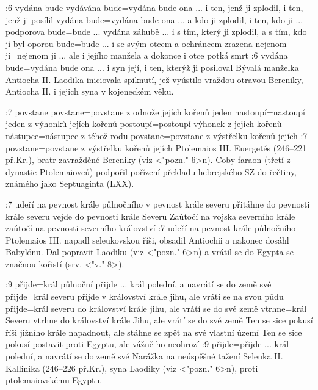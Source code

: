 :6
    {vydána bude}   %
    {vydávána bude}={vydána bude ona ... i ten, jenž ji zplodil, i ten, jenž ji posílil}   %
    {vydána bude}={vydána bude ona ... a kdo ji zplodil, i ten, kdo ji ... podporova}   %
    {bude}={bude ... vydána záhubě ... i s tím, který ji zplodil, a s tím, kdo jí byl oporou}   %
    {bude}={bude ... i se svým otcem a ochráncem zrazena}   %
    {nejenom ji}={nejenom ji ... ale i jejího manžela a dokonce i otce potká smrt}   %
:6 {vydána bude}={vydána bude ona ... i syn její, i ten, kterýž ji posiloval} 
    Bývalá manželka Antiocha II. Laodika iniciovala spiknutí, jež vyústilo vraždou otravou Bereniky, Antiocha II. i jejich syna v kojeneckém věku.


:7  
    {povstane}   %
    {povstane}={povstane z odnože jejích kořenů jeden}   %
    {nastoupí}={nastoupí jeden z výhonků jejích kořenů}   %
    {postoupí}={postoupí výhonek z jejích kořenů}   %
    {nástupce}={nástupce z téhož rodu}   %
    {povstane}={povstane z výstřelku kořenů jejích}   %
:7 {povstane}={povstane z výstřelku kořenů jejích}  Ptolemaios  III. Euergetés (246--221         př.Kr.), bratr zavražděné Bereniky (viz <"pozn." 6>n). Coby faraon (třetí z dynastie     Ptolemaiovců) podpořil pořízení překladu hebrejského SZ do řečtiny, známého jako Septuaginta (LXX). 


:7
    {udeří na pevnost krále půlnočního}   %
    {v pevnost krále severu}   %
    {přitáhne do pevnosti krále severu}   %
    {vejde do pevnosti krále Severu}   %
    {Zaútočí na vojska severního krále}   %
    {zaútočí na pevnosti severního království}   %
:7 {udeří na pevnost krále půlnočního}  
    Ptolemaios III. napadl seleukovskou říši, obsadil Antiochii a nakonec dosáhl Babylónu. Dal popravit Laodiku (viz <"pozn." 6>n) a vrátil se do Egypta se značnou kořistí (srv. <"v." 8>).


:9
    {přijde}={král půlnoční přijde ... král polední, a navrátí se do země své}   %
    {přijde}={král severu přijde v království krále jihu, ale vrátí se na svou půdu}   %
    {přijde}={král severu do království krále jihu, ale vrátí se do své země}   %
    {vtrhne}={král Severu vtrhne do království krále Jihu, ale vrátí se do své země}   %
    {Ten se sice pokusí říši jižního krále napadnout, ale stáhne se zpět na své vlastní území}  %
    {Ten se sice pokusí postavit proti Egyptu, ale vážně ho neohrozí}  %
:9 {přijde}={přijde ... král polední, a navrátí se do země své}  
    Narážka na neúspěšné tažení Seleuka II. Kallinika (246--226 př.Kr.), syna Laodiky (viz <"pozn." 6>n), proti ptolemaiovskému Egyptu.


